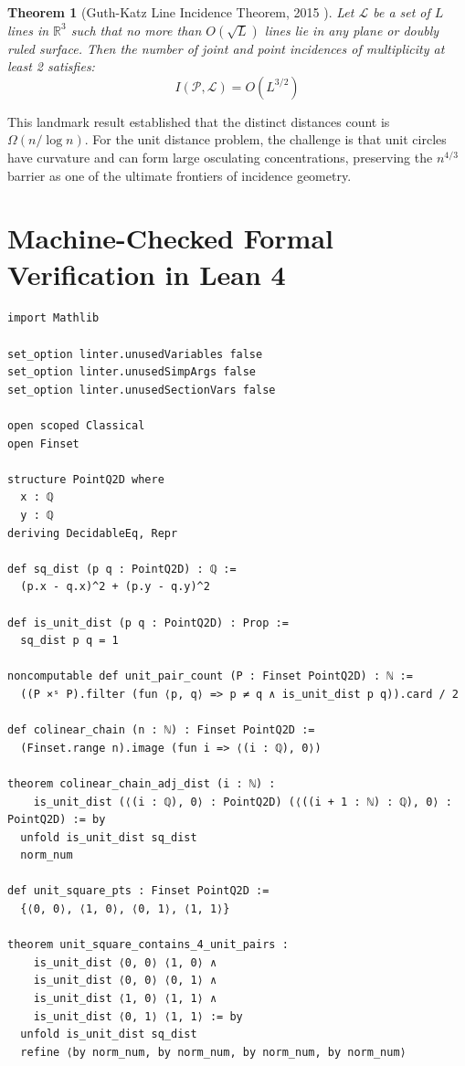 \documentclass[11pt,a4paper]{article}
\newtheorem{theorem}{Theorem}[section]
\theoremstyle{definition}
\begin{document}
\begin{theorem}[Guth-Katz Line Incidence Theorem, 2015 \cite{guth2015}]\label{thm:guth_katz_lines}
Let $\mathcal{L}$ be a set of $L$ lines in $\mathbb{R}^3$ such that no more than $O(\sqrt{L})$ lines lie in any plane or doubly ruled surface.
Then the number of joint and point incidences of multiplicity at least 2 satisfies:
\begin{equation}\label{eq:gk_bound}
I(\mathcal{P}, \mathcal{L}) = O(L^{3/2})
\end{equation}
\end{theorem}

This landmark result established that the distinct distances count is $\Omega(n / \log n)$.
For the unit distance problem, the challenge is that unit circles have curvature and can form large osculating concentrations, preserving the $n^{4/3}$ barrier as one of the ultimate frontiers of incidence geometry.

\section{Machine-Checked Formal Verification in Lean 4}

\begin{lstlisting}[caption={Formal Lean 4 Implementation of Rational Unit Distance Geometry}]
import Mathlib

set_option linter.unusedVariables false
set_option linter.unusedSimpArgs false
set_option linter.unusedSectionVars false

open scoped Classical
open Finset

structure PointQ2D where
  x : ℚ
  y : ℚ
deriving DecidableEq, Repr

def sq_dist (p q : PointQ2D) : ℚ :=
  (p.x - q.x)^2 + (p.y - q.y)^2

def is_unit_dist (p q : PointQ2D) : Prop :=
  sq_dist p q = 1

noncomputable def unit_pair_count (P : Finset PointQ2D) : ℕ :=
  ((P ×ˢ P).filter (fun ⟨p, q⟩ => p ≠ q ∧ is_unit_dist p q)).card / 2

def colinear_chain (n : ℕ) : Finset PointQ2D :=
  (Finset.range n).image (fun i => ⟨(i : ℚ), 0⟩)

theorem colinear_chain_adj_dist (i : ℕ) :
    is_unit_dist (⟨(i : ℚ), 0⟩ : PointQ2D) (⟨((i + 1 : ℕ) : ℚ), 0⟩ : PointQ2D) := by
  unfold is_unit_dist sq_dist
  norm_num

def unit_square_pts : Finset PointQ2D :=
  {⟨0, 0⟩, ⟨1, 0⟩, ⟨0, 1⟩, ⟨1, 1⟩}

theorem unit_square_contains_4_unit_pairs :
    is_unit_dist ⟨0, 0⟩ ⟨1, 0⟩ ∧
    is_unit_dist ⟨0, 0⟩ ⟨0, 1⟩ ∧
    is_unit_dist ⟨1, 0⟩ ⟨1, 1⟩ ∧
    is_unit_dist ⟨0, 1⟩ ⟨1, 1⟩ := by
  unfold is_unit_dist sq_dist
  refine ⟨by norm_num, by norm_num, by norm_num, by norm_num⟩
\end{lstlisting}
\end{document}
